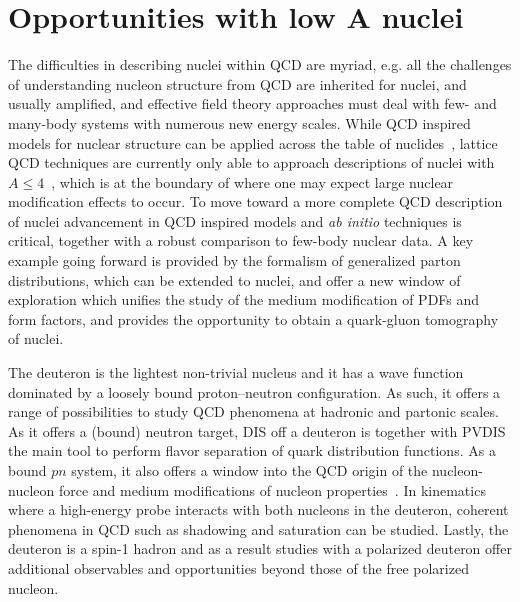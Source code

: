 \section{Opportunities with low $\mathbf{A}$ nuclei\label{sec:light}}
%
The difficulties in describing nuclei within QCD are myriad, e.g. all the challenges of understanding nucleon structure from QCD are inherited for nuclei, and usually amplified, and effective field theory approaches must deal with few- and many-body systems with numerous new energy scales. While QCD inspired models for nuclear structure can be applied across the table of nuclides~\cite{Cloet:2006bq,Cloet:2015tha,Stone:2017oqt,Stone:2016qmi}, lattice QCD 
techniques are currently only able to approach descriptions of nuclei with $A \leq 4$~\cite{Chang:2015qxa}, which is at the boundary of where one may expect large nuclear modification effects to occur. To move toward a more complete QCD description of nuclei advancement in QCD inspired models and {\it ab initio} techniques is critical, together with a robust comparison to few-body nuclear data. A key example going forward is provided by the formalism of generalized parton distributions, which can be extended to nuclei, and offer a new window of exploration which unifies the study of the medium modification of PDFs and form factors, and provides the opportunity to obtain a quark-gluon tomography of nuclei. 



The deuteron is the lightest non-trivial nucleus and it has a wave function dominated by a loosely bound proton--neutron configuration.  As such, it offers a range of possibilities to study QCD phenomena at hadronic and partonic scales.  As it offers a (bound) neutron target, DIS off a deuteron is together with PVDIS the main tool to perform flavor separation of quark distribution functions.  As a bound $pn$ system, it also offers a window into the QCD origin of the nucleon-nucleon force and medium modifications of nucleon properties~\cite{Boeglin:2015cha}.  In kinematics where a high-energy probe interacts with both nucleons in the deuteron, coherent phenomena in QCD such as shadowing and saturation can be studied.  Lastly, the deuteron is a spin-1 hadron and as a result studies with a polarized deuteron offer additional observables and opportunities beyond those of the free polarized nucleon.

